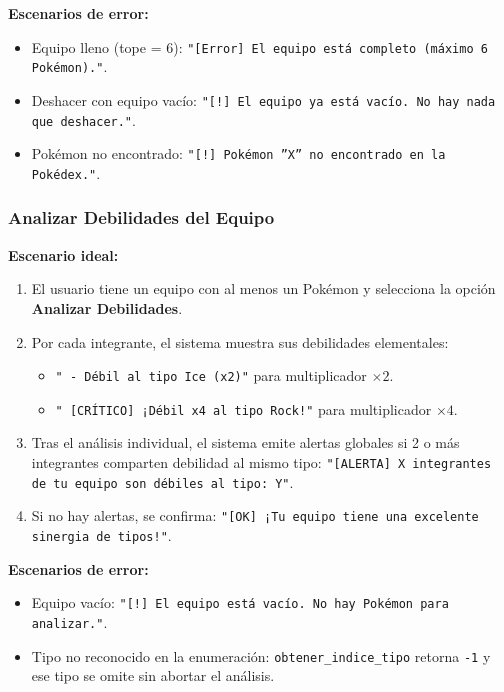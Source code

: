 \documentclass[12pt, letterpaper]{article}
\begin{document}
\textbf{Escenarios de error:}
\begin{itemize}
    \item Equipo lleno (tope = 6): \texttt{"[Error] El equipo está completo (máximo 6 Pokémon)."}.
    \item Deshacer con equipo vacío: \texttt{"[!] El equipo ya está vacío. No hay nada que deshacer."}.
    \item Pokémon no encontrado: \texttt{"[!] Pokémon ''X'' no encontrado en la Pokédex."}.
\end{itemize}

\subsubsection{Analizar Debilidades del Equipo}

\textbf{Escenario ideal:}
\begin{enumerate}
    \item El usuario tiene un equipo con al menos un Pokémon y selecciona la opción \textbf{Analizar Debilidades}.
    \item Por cada integrante, el sistema muestra sus debilidades elementales:
    \begin{itemize}
        \item \texttt{"  - Débil al tipo Ice (x2)"} para multiplicador $\times 2$.
        \item \texttt{"  [CRÍTICO] ¡Débil x4 al tipo Rock!"} para multiplicador $\times 4$.
    \end{itemize}
    \item Tras el análisis individual, el sistema emite alertas globales si 2 o más integrantes comparten debilidad al mismo tipo: \texttt{"[ALERTA] X integrantes de tu equipo son débiles al tipo: Y"}.
    \item Si no hay alertas, se confirma: \texttt{"[OK] ¡Tu equipo tiene una excelente sinergia de tipos!"}.
\end{enumerate}

\textbf{Escenarios de error:}
\begin{itemize}
    \item Equipo vacío: \texttt{"[!] El equipo está vacío. No hay Pokémon para analizar."}.
    \item Tipo no reconocido en la enumeración: \texttt{obtener\_indice\_tipo} retorna \texttt{-1} y ese tipo se omite sin abortar el análisis.
\end{itemize}

\end{document}
